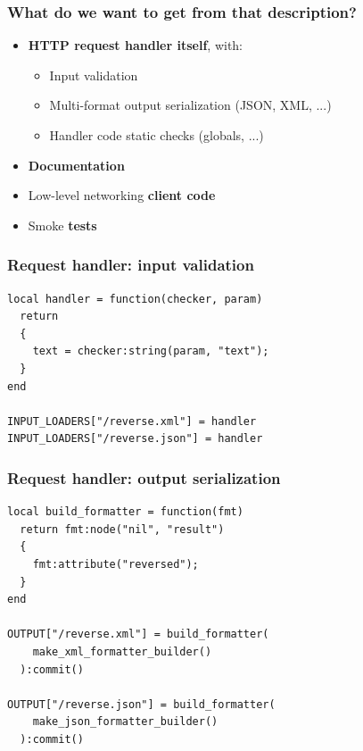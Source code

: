 \documentclass[handout]{beamer}
\begin{document}
\begin{frame}

\frametitle{What do we want to get from that description?}

\begin{itemize}
\item \textbf{HTTP request handler itself}, with:
  \begin{itemize}
  \item Input validation
  \item Multi-format output serialization (JSON, XML, ...)
  \item Handler code static checks (globals, ...)
  \end{itemize}
\item \textbf{Documentation}
\item Low-level networking \textbf{client code}
\item Smoke \textbf{tests}
\end{itemize}

\end{frame}


\begin{frame}[fragile]

\frametitle{Request handler: input validation}

\begin{verbatim}
local handler = function(checker, param)
  return
  {
    text = checker:string(param, "text");
  }
end

INPUT_LOADERS["/reverse.xml"] = handler
INPUT_LOADERS["/reverse.json"] = handler
\end{verbatim}

\end{frame}


\begin{frame}[fragile]

\frametitle{Request handler: output serialization}

\begin{verbatim}
local build_formatter = function(fmt)
  return fmt:node("nil", "result")
  {
    fmt:attribute("reversed");
  }
end

OUTPUT["/reverse.xml"] = build_formatter(
    make_xml_formatter_builder()
  ):commit()

OUTPUT["/reverse.json"] = build_formatter(
    make_json_formatter_builder()
  ):commit()
\end{verbatim}

\end{frame}
\end{document}
